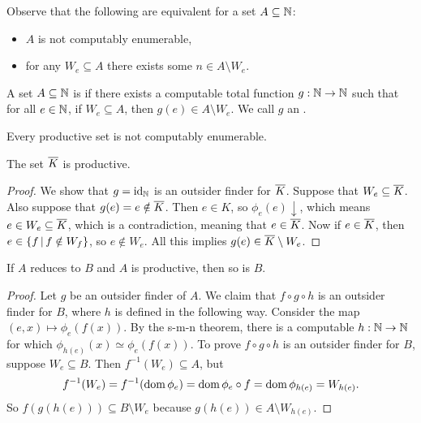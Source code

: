 Observe that the following are equivalent for a set $A \subseteq \mathbb{N}$:
\begin{itemize}
\item $A$ is not computably enumerable,
\item for any $W_e \subseteq A$ there exists some $n \in A \setminus W_e$.
\end{itemize}
A set $A \subseteq \mathbb{N}$ is  if there exists a computable total
function $g: \mathbb{N} \to \mathbb{N}$ such that for all $e \in \mathbb{N}$, if $W_e \subseteq A$, then
$g(e) \in A \setminus W_e$.
We call $g$ an .

\begin{proposition}
  Every productive set is not computably enumerable.
\end{proposition}

\begin{proposition}
  The set $\overline{K}$ is productive.
\end{proposition}

\begin{proof}
  We show that $g = \operatorname{id}_{\mathbb{N}}$ is an outsider finder for $\overline{K}$.
  Suppose that $W_e \subseteq \overline{K}$.
  Also suppose that $g(e) = e \notin \overline{K}$.
  Then $e \in K$, so $\phi_e(e) \downarrow$, which means $e \in W_e \subseteq
  \overline{K}$, which is a contradiction, meaning that $e \in \overline{K}$.
  Now if $e \in \overline{K}$, then $e \in \{ f \,|\, f \notin W_f \}$, so $e \notin
  W_e$.
  All this implies $g(e) \in \overline{K} \setminus W_e$.
\end{proof}


\begin{lemma}
  If $A$ reduces to $B$ and $A$ is productive, then so is $B$.
\end{lemma}

\begin{proof}
  Let $g$ be an outsider finder of $A$.
  We claim that $f \circ g \circ h$ is an outsider finder for $B$, where $h$ is
  defined in the following way.
  Consider the map $(e,x) \mapsto \phi_e(f(x))$.
  By the s-m-n theorem, there is a computable $h: \mathbb{N} \to \mathbb{N}$ for which
  $\phi_{h(e)}(x) \simeq \phi_e(f(x))$.
  To prove $f \circ g \circ h$ is an outsider finder for $B$, suppose $W_e
  \subseteq B$.
  Then $f^{-1}(W_e) \subseteq A$, but
  \[
	f^{-1}(W_e) = f^{-1}(\operatorname{dom} \phi_e) = \operatorname{dom} \phi_e
	\circ f = \operatorname{dom} \phi_{h(e)} = W_{h(e)}.
  \]
  So $f(g(h(e))) \subseteq B \setminus W_e$ because $g(h(e)) \in A \setminus
  W_{h(e)}$.
\end{proof}

